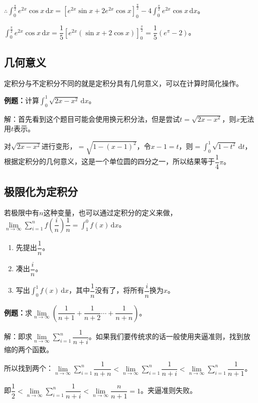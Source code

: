 \documentclass[UTF8, 12pt]{ctexart}
\begin{document}
$\therefore\int_0^\frac{\pi}{2}e^{2x}\cos x\,\textrm{d}x=[e^{2x}\sin x+2e^{2x}\cos x]_0^\frac{\pi}{2}-4\int_0^\frac{\pi}{2}e^{2x}\cos x\,\textrm{d}x$。

$\int_0^\frac{\pi}{2}e^{2x}\cos x\,\textrm{d}x=\dfrac{1}{5}[e^{2x}(\sin x+2\cos x)]_0^\frac{\pi}{2}=\dfrac{1}{5}(e^\pi-2)$。

\subsection{几何意义}

定积分与不定积分不同的就是定积分具有几何意义，可以在计算时简化操作。

\textbf{例题：}计算$\int_0^1\sqrt{2x-x^2}\,\textrm{d}x$。

解：首先看到这个题目可能会使用换元积分法，但是尝试$t=\sqrt{2x-x^2}$，则$x$无法用$t$表示。

对$\sqrt{2x-x^2}$进行变形，$=\sqrt{1-(x-1)^2}$，令$x-1=t$，则$=\int_0^1\sqrt{1-t^2}\,\textrm{d}t$，根据定积分的几何意义，这是一个单位圆的四分之一，所以结果等于$\dfrac{1}{4}\pi$。

\subsection{极限化为定积分}

若极限中有$n$这种变量，也可以通过定积分的定义来做，$\lim\limits_{n\to\infty}\sum\limits_{i=1}^nf\left(\dfrac{i}{n}\right)\dfrac{1}{n}=\int_1^0f(x)\,\textrm{d}x$。

\begin{enumerate}
    \item 先提出$\dfrac{1}{n}$。
    \item 凑出$\dfrac{i}{n}$。
    \item 写出$\int_0^1f(x)\,\textrm{d}x$，其中$\dfrac{1}{n}$没有了，将所有$\dfrac{i}{n}$换为$x$。
\end{enumerate}

\textbf{例题：}求$\lim\limits_{n\to\infty}\left(\dfrac{1}{n+1}+\dfrac{1}{n+2}\cdots+\dfrac{1}{n+n}\right)$。

解：即求$\lim\limits_{n\to\infty}\sum\limits_{i=1}^n\dfrac{1}{n+i}$。如果我们要传统求的话一般使用夹逼准则，找到放缩的两个函数。

所以找到两个：$\lim\limits_{n\to\infty}\sum\limits_{i=1}^n\dfrac{1}{n+n}<\lim\limits_{n\to\infty}\sum\limits_{i=1}^n\dfrac{1}{n+i}<\lim\limits_{n\to\infty}\sum\limits_{i=1}^n\dfrac{1}{n+1}$。

即$\dfrac{1}{2}<\lim\limits_{n\to\infty}\sum\limits_{i=1}^n\dfrac{1}{n+i}<\lim\limits_{n\to\infty}\dfrac{n}{n+1}=1$。夹逼准则失败。
\end{document}
